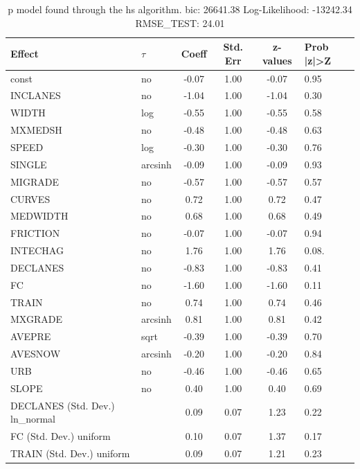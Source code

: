 \begin{table}
	\caption{p model found through the hs algorithm. bic: 26641.38 Log-Likelihood: -13242.34 RMSE_TEST: 24.01}
	\begin{center}
		\begin{tabular}{|l|l|c|c|c|l|}
			\hline
			Effect & $\tau$ & Coeff & Std. Err & z-values & Prob |z|>Z \\
			\hline
			const & no & -0.07 & 1.00 & -0.07 & 0.95 \\
			\hline
			INCLANES & no & -1.04 & 1.00 & -1.04 & 0.30 \\
			\hline
			WIDTH & log & -0.55 & 1.00 & -0.55 & 0.58 \\
			\hline
			MXMEDSH & no & -0.48 & 1.00 & -0.48 & 0.63 \\
			\hline
			SPEED & log & -0.30 & 1.00 & -0.30 & 0.76 \\
			\hline
			SINGLE & arcsinh & -0.09 & 1.00 & -0.09 & 0.93 \\
			\hline
			MIGRADE & no & -0.57 & 1.00 & -0.57 & 0.57 \\
			\hline
			CURVES & no & 0.72 & 1.00 & 0.72 & 0.47 \\
			\hline
			MEDWIDTH & no & 0.68 & 1.00 & 0.68 & 0.49 \\
			\hline
			FRICTION & no & -0.07 & 1.00 & -0.07 & 0.94 \\
			\hline
			INTECHAG & no & 1.76 & 1.00 & 1.76 & 0.08. \\
			\hline
			DECLANES & no & -0.83 & 1.00 & -0.83 & 0.41 \\
			\hline
			FC & no & -1.60 & 1.00 & -1.60 & 0.11 \\
			\hline
			TRAIN & no & 0.74 & 1.00 & 0.74 & 0.46 \\
			\hline
			MXGRADE & arcsinh & 0.81 & 1.00 & 0.81 & 0.42 \\
			\hline
			AVEPRE & sqrt & -0.39 & 1.00 & -0.39 & 0.70 \\
			\hline
			AVESNOW & arcsinh & -0.20 & 1.00 & -0.20 & 0.84 \\
			\hline
			URB & no & -0.46 & 1.00 & -0.46 & 0.65 \\
			\hline
			SLOPE & no & 0.40 & 1.00 & 0.40 & 0.69 \\
			\hline
			DECLANES (Std. Dev.) ln_normal &  & 0.09 & 0.07 & 1.23 & 0.22 \\
			\hline
			FC (Std. Dev.) uniform &  & 0.10 & 0.07 & 1.37 & 0.17 \\
			\hline
			TRAIN (Std. Dev.) uniform &  & 0.09 & 0.07 & 1.21 & 0.23 \\

\end{tabular}
\end{center}
\end{table}
